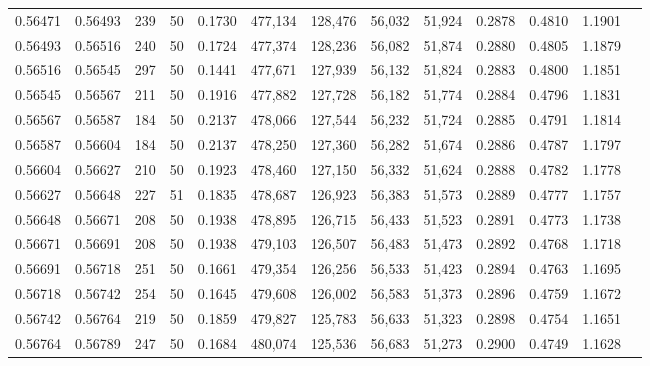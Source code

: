 \begin{tabular}{rrrrrrrrrrrrr}
0.56471 & 0.56493 &   239 &  50 &                                     0.1730 & 477,134 & 128,476 &  56,032 &  51,924 & 0.2878 & 0.4810 & 1.1901 \\
0.56493 & 0.56516 &   240 &  50 &                                     0.1724 & 477,374 & 128,236 &  56,082 &  51,874 & 0.2880 & 0.4805 & 1.1879 \\
0.56516 & 0.56545 &   297 &  50 &                                     0.1441 & 477,671 & 127,939 &  56,132 &  51,824 & 0.2883 & 0.4800 & 1.1851 \\
0.56545 & 0.56567 &   211 &  50 &                                     0.1916 & 477,882 & 127,728 &  56,182 &  51,774 & 0.2884 & 0.4796 & 1.1831 \\
0.56567 & 0.56587 &   184 &  50 &                                     0.2137 & 478,066 & 127,544 &  56,232 &  51,724 & 0.2885 & 0.4791 & 1.1814 \\
0.56587 & 0.56604 &   184 &  50 &                                     0.2137 & 478,250 & 127,360 &  56,282 &  51,674 & 0.2886 & 0.4787 & 1.1797 \\
0.56604 & 0.56627 &   210 &  50 &                                     0.1923 & 478,460 & 127,150 &  56,332 &  51,624 & 0.2888 & 0.4782 & 1.1778 \\
0.56627 & 0.56648 &   227 &  51 &                                     0.1835 & 478,687 & 126,923 &  56,383 &  51,573 & 0.2889 & 0.4777 & 1.1757 \\
0.56648 & 0.56671 &   208 &  50 &                                     0.1938 & 478,895 & 126,715 &  56,433 &  51,523 & 0.2891 & 0.4773 & 1.1738 \\
0.56671 & 0.56691 &   208 &  50 &                                     0.1938 & 479,103 & 126,507 &  56,483 &  51,473 & 0.2892 & 0.4768 & 1.1718 \\
0.56691 & 0.56718 &   251 &  50 &                                     0.1661 & 479,354 & 126,256 &  56,533 &  51,423 & 0.2894 & 0.4763 & 1.1695 \\
0.56718 & 0.56742 &   254 &  50 &                                     0.1645 & 479,608 & 126,002 &  56,583 &  51,373 & 0.2896 & 0.4759 & 1.1672 \\
0.56742 & 0.56764 &   219 &  50 &                                     0.1859 & 479,827 & 125,783 &  56,633 &  51,323 & 0.2898 & 0.4754 & 1.1651 \\
0.56764 & 0.56789 &   247 &  50 &                                     0.1684 & 480,074 & 125,536 &  56,683 &  51,273 & 0.2900 & 0.4749 & 1.1628 \\

\end{tabular}
